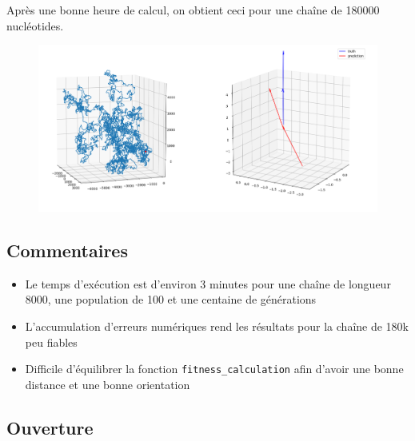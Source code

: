 \documentclass[graphics]{beamer}
\begin{document}
\begin{frame}
	Après une bonne heure de calcul, on obtient ceci pour une chaîne de 180000 nucléotides.
	\begin{figure}[H]
		\centering
		\includegraphics[scale=0.25]{180}
	\end{figure}
\end{frame}

\subsection{Commentaires}
	
\begin{frame}
	\begin{itemize}
		\item Le temps d'exécution est d'environ 3 minutes pour une chaîne de longueur 8000, une population de 100 et une centaine de générations
		\item L'accumulation d'erreurs numériques rend les résultats pour la chaîne de 180k peu fiables
		\item Difficile d'équilibrer la fonction \texttt{fitness_calculation} afin d'avoir une bonne distance et une bonne orientation
	\end{itemize}
\end{frame}

\subsection{Ouverture}
\end{document}
